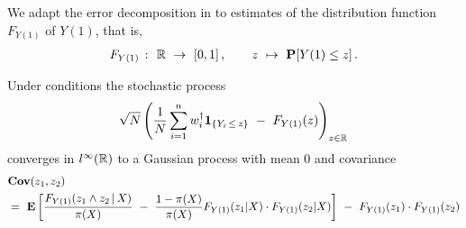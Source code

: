 We adapt the error decomposition in \cite[page 27]{Wang2019} 
to estimates of the distribution function $F_{Y(1)}$ of $Y(1)$, 
that is,
\begin{gather}
  F_{Y(1)}
  \ 
  \colon
  \ 
  \R
  \ 
  \to
  \ 
  [0,1]
  \, 
  , 
  \qquad
  z
  \ 
  \mapsto
  \ 
  \P
  [
  Y(1)
  \le
  z
  ]
  \,.
\end{gather}
\begin{ftheorem}
  \label{aa:mean:th}
  Under conditions 
the stochastic process
\begin{gather}
    \sqrt{N}
    \left( 
  \frac{1}{N}
    \sum_{i=1}^{n} 
    w_i^\dagger
    \mathbf{1}
    _{\left\{ Y_i\,\le\, z \right\}}
    \ 
    -
    \ 
    F_{Y(1)}(z)
    \right)
    _{z\in\R}
    \,
  \end{gather}
  converges in
  $l^\infty(\mathbb{R})$
  to a Gaussian process with mean 0 and covariance
\begin{align}
  \label{cov:lp}
  &
  \mathbf{Cov}
  (z_1,z_2)
  \\
  &
  =\ 
  \E
  \left[ 
 \frac{
 F_{Y(1)}(z_1 \land z_2\,|\,X)
}{\pi(X)}
\ 
-
\ 
 \frac{1-\pi(X)}{\pi(X)}
 F_{Y(1)}(z_1|X)
 \cdot
 F_{Y(1)}(z_2|X)
  \right]
  \ 
 -
 \ 
 F_{Y(1)}(z_1)
 \cdot
 F_{Y(1)}(z_2)
\end{align}
\end{ftheorem}

